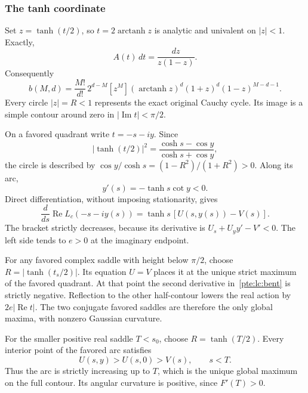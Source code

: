 \documentclass[11pt,a4paper]{article}
\numberwithin{equation}{section}
\theoremstyle{definition}
\theoremstyle{plain}
\begin{document}
\subsubsection{The tanh coordinate}
Set $z=\tanh(t/2)$, so $t=2\operatorname{arctanh}z$ is analytic and univalent on $|z|<1$. Exactly,
\begin{equation}\label{pte:lc:differential}
 A(t)\,dt=\frac{dz}{z(1-z)}.
\end{equation}
Consequently
\begin{equation}\label{pte:lc:tanhcoefficient}
 b(M,d)=\frac{M!}{d!}\,2^{d-M}[z^M]
 (\operatorname{arctanh}z)^d(1+z)^d(1-z)^{M-d-1}.
\end{equation}
Every circle $|z|=R<1$ represents the exact original Cauchy cycle. Its image is a simple contour around zero in $|\operatorname{Im}t|<\pi/2$.

On a favored quadrant write $t=-s-iy$. Since
\[
 |\tanh(t/2)|^2=\frac{\cosh s-\cos y}{\cosh s+\cos y},
\]
the circle is described by $\cos y/\cosh s=(1-R^2)/(1+R^2)>0$. Along its arc,
\[
 y'(s)=-\tanh s\cot y<0.
\]
Direct differentiation, without imposing stationarity, gives
\begin{equation}\label{pte:lc:bent}
 \frac d{ds}\operatorname{Re}L_c(-s-iy(s))
 =\tanh s\,[U(s,y(s))-V(s)].
\end{equation}
The bracket strictly decreases, because its derivative is $U_s+U_y y'-V'<0$. The left side tends to $e>0$ at the imaginary endpoint.

For any favored complex saddle with height below $\pi/2$, choose $R=|\tanh(t_s/2)|$. Its equation $U=V$ places it at the unique strict maximum of the favored quadrant. At that point the second derivative in~\eqref{pte:lc:bent} is strictly negative. Reflection to the other half-contour lowers the real action by $2e|\operatorname{Re}t|$. The two conjugate favored saddles are therefore the only global maxima, with nonzero Gaussian curvature.

For the smaller positive real saddle $T<s_0$, choose $R=\tanh(T/2)$. Every interior point of the favored arc satisfies
\[
 U(s,y)>U(s,0)>V(s),\qquad s<T.
\]
Thus the arc is strictly increasing up to $T$, which is the unique global maximum on the full contour. Its angular curvature is positive, since $F'(T)>0$.
\end{document}
